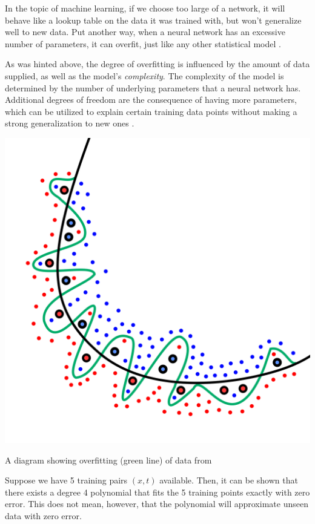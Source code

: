 \documentclass[nobib]{tufte-handout} %
\begin{document}
In the topic of machine learning, if we choose too large of a network, it will behave like a lookup table on the data it was trained with, but won't generalize well to new data. Put another way, when a neural network has an excessive number of parameters, it can overfit, just like any other statistical model \citep{book:AIModernApp}.

As was hinted above, the degree of overfitting is influenced by the amount of data supplied, as well as the model's \textit{complexity}. The complexity of the model is determined by the number of underlying parameters that a neural network has. Additional degrees of freedom are the consequence of having more parameters, which can be utilized to explain certain training data points without making a strong generalization to new ones \citep{inbook:Aggarwal-4.1}.
\begin{marginfigure}
  \includegraphics{Overfitting}
  \label{Overfitting}
  \caption{A diagram showing overfitting (green line) of data from \citep{overfitting-img}}
\end{marginfigure}
\begin{example}
  Suppose we have 5 training pairs $(x, t)$ available. Then, it can be shown that there exists a degree 4 polynomial that fits the 5 training points exactly with zero error. This does not mean, however, that the polynomial will approximate unseen data with zero error. 
\end{example}
\end{document}
